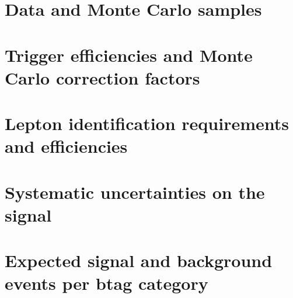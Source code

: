 \chapter{Data and Monte Carlo samples}
\label{sec:tablessamples}






\chapter{Trigger efficiencies and Monte Carlo correction factors}
\label{sec:hltsf}


\chapter{Lepton identification requirements and efficiencies}
\label{sec:datamcsf}



\chapter{Systematic uncertainties on the signal}
\label{sec:appsyst}





%

%

\chapter{Expected signal and background events per btag category}
\label{sec:numberevents}


